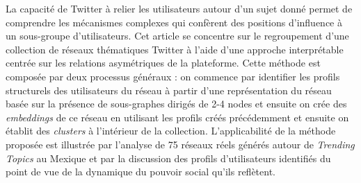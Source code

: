 
La capacité de Twitter à relier les utilisateurs autour d'un sujet donné permet de comprendre les mécanismes complexes qui confèrent des positions d'influence à un sous-groupe d'utilisateurs. Cet article se concentre sur le regroupement d'une collection de réseaux thématiques Twitter à l'aide d'une approche interprétable centrée sur les relations asymétriques de la plateforme. Cette méthode est composée par deux processus généraux : on commence par identifier les profils structurels des utilisateurs du réseau à partir d'une représentation du réseau basée sur la présence de sous-graphes dirigés de 2-4 nodes et ensuite on crée des \textit{embeddings} de ce réseau en utilisant les profils créés précédemment et ensuite on établit des \textit{clusters} à l'intérieur de la collection. L'applicabilité de la méthode proposée est illustrée par l'analyse de 75 réseaux réels générés autour de \textit{Trending Topics} au Mexique et par la discussion des profils d'utilisateurs identifiés du point de vue de la dynamique du pouvoir social qu'ils reflètent.